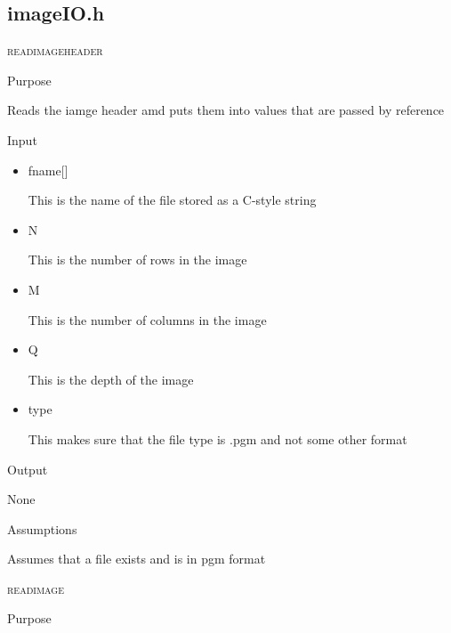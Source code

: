 \documentclass[pdftex, 11pt]{article}
\begin{document}
\subsection{imageIO.h}

\begin{description}
	\item{\textsc{readimageheader}}
		\begin{description}
			\item{Purpose}

				Reads the iamge header amd puts them into values that
				are passed by reference

			\item{Input}

				\begin{itemize}

					\item{fname[]}

						This is the name of the file stored
						as a C-style string

					\item{N}

						This is the number of rows in the image

					\item{M}

						This is the number of columns in
						the image

					\item{Q}

						This is the depth of the image

					\item{type}

						This makes sure that the file type is
						.pgm and not some other format
						
				\end{itemize}
						
						
			\item{Output}

				None

			\item{Assumptions}

				Assumes that a file exists and is in pgm format

		\end{description}


	\item{\textsc{readimage}}
		\begin{description}
			\item{Purpose}


\end{description}
\end{description}
\end{document}
